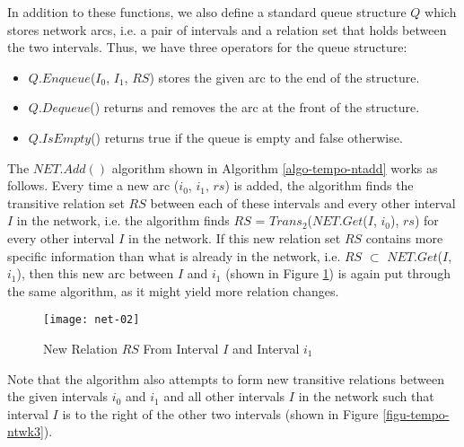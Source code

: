 \documentclass[11pt]{report}
\begin{document}
          In addition to these functions, we also define a standard queue
          structure $Q$ which stores network arcs, i.e. a pair of intervals
          and a relation set that holds between the two intervals. Thus, we
          have three operators for the queue structure:

          \begin{itemize}
            \item
              $Q.Enqueue$($I_0$, $I_1$, $RS$) stores the given arc to the end
              of the structure.
            \item
              $Q.Dequeue$() returns and removes the arc at the front of the
              structure.
            \item
              $Q.IsEmpty$() returns true if the queue is empty and false
              otherwise.
          \end{itemize}

          The $NET.Add()$ algorithm shown in Algorithm \ref{algo-tempo-ntadd}
          works as follows. Every time a new arc ($i_0$, $i_1$, $rs$) is added,
          the algorithm finds the transitive relation set $RS$ between each of
          these intervals and every other interval $I$ in the network, i.e.
          the algorithm finds $RS$ = $Trans_2$($NET.Get$($I$, $i_0$), $rs$) for
          every other interval $I$ in the network. If this new relation set
          $RS$ contains more specific information than what is already in the
          network, i.e. $RS$ $\subset$ $NET.Get$($I$, $i_1$), then this new arc
          between $I$ and $i_1$ (shown in Figure \ref{figu-tempo-ntwk2}) is
          again put through the same algorithm, as it might yield more relation
          changes.

          \begin{figure}[tbhp]
            \begin{center}
              \texttt{[image: net-02]}
              \caption{New Relation $RS$ From Interval $I$ and Interval $i_1$}
              \label{figu-tempo-ntwk2}
            \end{center}
          \end{figure}

          Note that the algorithm also attempts to form new transitive
          relations between the given intervals $i_0$ and $i_1$ and all other
          intervals $I$ in the network such that interval $I$ is to the right
          of the other two intervals (shown in Figure \ref{figu-tempo-ntwk3}).
\end{document}
